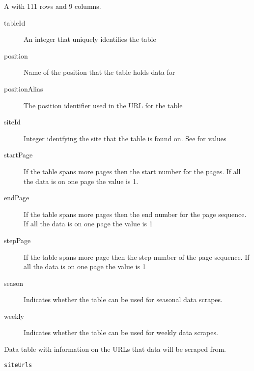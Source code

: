 \documentclass[a4paper]{book}
\begin{document}
\begin{Format}
A  with 111 rows and 9 columns.
\begin{description}

\item[tableId] An integer that uniquely identifies the table
\item[position] Name of the position that the table holds data for
\item[positionAlias] The position identifier used in the URL for the table
\item[siteId] Integer identfying the site that the table is found on. See
 for values
\item[startPage] If the table spans more pages then the start number for the
pages. If all the data is on one page the value is 1.
\item[endPage] If the table spans more pages then the end number for the page
sequence. If all the data is on one page the value is 1
\item[stepPage] If the table spans more page then the step number of the page
sequence. If all the data is on one page the value is 1
\item[season] Indicates whether the table can be used for seasonal data scrapes.
\item[weekly] Indicates whether the table can be used for weekly data scrapes.

\end{description}
\end{Format}
%
\begin{Description}\relax
Data table with information on the URLs that data will be scraped from.
\end{Description}
%
\begin{Usage}
\begin{verbatim}
siteUrls
\end{verbatim}
\end{Usage}
%
\end{document}
